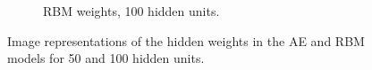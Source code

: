 \documentclass{article}
\begin{document}
\begin{figure}[!ht]
\begin{subfigure}[t]{0.47\textwidth}
    \caption{RBM weights, 100 hidden units.}
    \label{fig:w100rbm}
  \end{subfigure}
  \caption{
    Image representations of the hidden weights in the AE and RBM models
    for 50 and 100 hidden units.
  }
  \label{fig:hiddenweights}
\end{figure}
\end{document}
